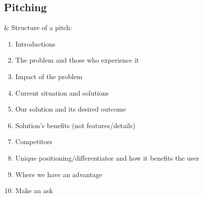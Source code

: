 \subsection{Pitching}
	\label{subsec:pitching}
\begin{easylist}

& Structure of a pitch:
	\begin{enumerate}
		\item Introductions
		\item The problem and those who experience it
		\item Impact of the problem
		\item Current situation and solutions
		\item Our solution and its desired outcome
		\item Solution's benefits (not features/details)
		\item Competitors
		\item Unique positioning/differentiator and how it benefits the user
		\item Where we have an advantage
		\item Make an ask
	\end{enumerate}

\end{easylist}
\clearpage
